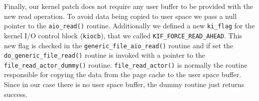 Finally, our kernel patch does not require any user buffer to be provided with the new read operation. To avoid data being copied to user space we pass a null pointer to the \texttt{aio\_read()} routine. Additionally we defined a new \texttt{ki\_flag} for the kernel I/O control block (\texttt{kiocb}), that we called \texttt{KIF\_FORCE\_READ\_AHEAD}. This new flag is checked in the \texttt{generic\_file\_aio\_read()} routine and if set the \texttt{do\_generic\_file\_read()} routine is invoked with a pointer to the \texttt{file\_read\_actor\_dummy()} routine. \texttt{file\_read\_actor()} is normally the routine responsible for copying the data from the page cache to the user space buffer. Since in our case there is no user space buffer, the dummy routine just returns success.
